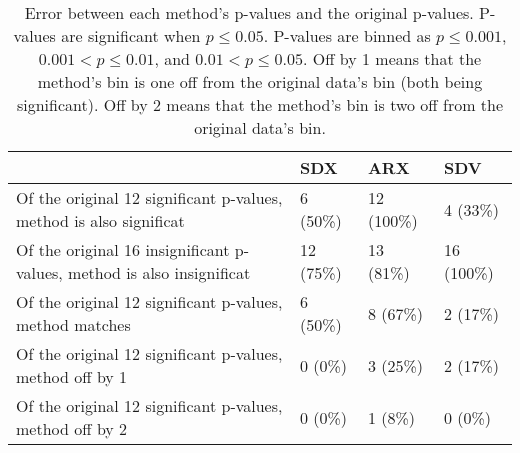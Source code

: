 
      \begin{table}
      \begin{center}
      \begin{small}
      \begin{tabular}{llll}
      \toprule
        & SDX & ARX & SDV \\
      \midrule
        Of the original 12 significant p-values, method is also significat  & 6 (50\%)  & 12 (100\%)  & 4 (33\%)  \\ 
    Of the original 16 insignificant p-values, method is also insignificat  & 12 (75\%)  & 13 (81\%)  & 16 (100\%)  \\ 
    Of the original 12 significant p-values, method matches  & 6 (50\%)  & 8 (67\%)  & 2 (17\%)  \\ 
    Of the original 12 significant p-values, method off by 1  & 0 (0\%)  & 3 (25\%)  & 2 (17\%)  \\ 
    Of the original 12 significant p-values, method off by 2  & 0 (0\%)  & 1 (8\%)  & 0 (0\%)  \\ 

      \bottomrule
      \end{tabular}
      \end{small}
      \caption{Error between each method's p-values and the original p-values. P-values are significant when $p \leq 0.05$. P-values are binned as $p \leq 0.001$, $0.001 < p \leq 0.01$, and $0.01 < p \leq 0.05$. Off by 1 means that the method's bin is one off from the original data's bin (both being significant). Off by 2 means that the method's bin is two off from the original data's bin.
      }
      \label{tab:p_table}
      \end{center}
      \end{table}
    